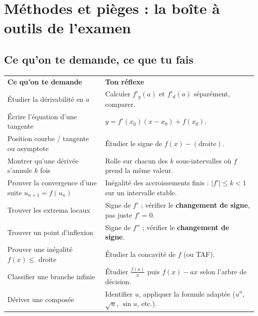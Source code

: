 \documentclass[11pt,a4paper]{article}
\begin{document}
\section{Méthodes et pièges : la boîte à outils de l'examen}

\subsection{Ce qu'on te demande, ce que tu fais}

\begin{center}
\renewcommand{\arraystretch}{1.45}
\sffamily\small
\begin{tabular}{>{\raggedright\arraybackslash}p{7.2cm} >{\raggedright\arraybackslash}p{8cm}}
\rowcolor{qtealdark} \color{white}\bfseries Ce qu'on te demande & \color{white}\bfseries Ton réflexe \\
\rowcolor{tealpale} Étudier la dérivabilité en $a$ & Calculer $f'_g(a)$ et $f'_d(a)$ séparément, comparer. \\
Écrire l'équation d'une tangente & $y = f'(x_0)(x - x_0) + f(x_0)$. \\
\rowcolor{tealpale} Position courbe / tangente ou asymptote & Étudier le signe de $f(x) - (\text{droite})$. \\
Montrer qu'une dérivée s'annule $k$ fois & Rolle sur chacun des $k$ sous-intervalles où $f$ prend la même valeur. \\
\rowcolor{tealpale} Prouver la convergence d'une suite $u_{n+1}=f(u_n)$ & Inégalité des accroissements finis : $|f'| \leq k < 1$ sur un intervalle stable. \\
Trouver les extrema locaux & Signe de $f'$ ; vérifier le \textbf{changement de signe}, pas juste $f'=0$. \\
\rowcolor{tealpale} Trouver un point d'inflexion & Signe de $f''$ ; vérifier le \textbf{changement de signe}. \\
Prouver une inégalité $f(x) \leq $ droite & Étudier la concavité de $f$ (ou TAF). \\
\rowcolor{tealpale} Classifier une branche infinie & Étudier $\frac{f(x)}{x}$ puis $f(x) - ax$ selon l'arbre de décision. \\
Dériver une composée & Identifier $u$, appliquer la formule adaptée ($u^n$, $\sqrt{u}$, $\sin u$, etc.). \\
\end{tabular}
\end{center}
\end{document}
